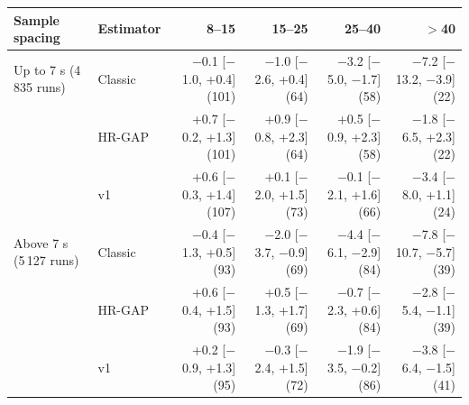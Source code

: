 \begin{tabular}{@{}llrrrr@{}}
\toprule
Sample spacing & Estimator & 8--15 & 15--25 & 25--40 & $>$40 \\
\midrule
Up to 7 s (4\,835 runs) & Classic & $-$0.1 [$-$1.0, +0.4] (101) & $-$1.0 [$-$2.6, +0.4] (64) & $-$3.2 [$-$5.0, $-$1.7] (58) & $-$7.2 [$-$13.2, $-$3.9] (22) \\
 & HR-GAP & +0.7 [$-$0.2, +1.3] (101) & +0.9 [$-$0.8, +2.3] (64) & +0.5 [$-$0.9, +2.3] (58) & $-$1.8 [$-$6.5, +2.3] (22) \\
 & \ascent{} v1 & +0.6 [$-$0.3, +1.4] (107) & +0.1 [$-$2.0, +1.5] (73) & $-$0.1 [$-$2.1, +1.6] (66) & $-$3.4 [$-$8.0, +1.1] (24) \\
\addlinespace[2pt]
Above 7 s (5\,127 runs) & Classic & $-$0.4 [$-$1.3, +0.5] (93) & $-$2.0 [$-$3.7, $-$0.9] (69) & $-$4.4 [$-$6.1, $-$2.9] (84) & $-$7.8 [$-$10.7, $-$5.7] (39) \\
 & HR-GAP & +0.6 [$-$0.4, +1.5] (93) & +0.5 [$-$1.3, +1.7] (69) & $-$0.7 [$-$2.3, +0.6] (84) & $-$2.8 [$-$5.4, $-$1.1] (39) \\
 & \ascent{} v1 & +0.2 [$-$0.9, +1.3] (95) & $-$0.3 [$-$2.4, +1.5] (72) & $-$1.9 [$-$3.5, $-$0.2] (86) & $-$3.8 [$-$6.4, $-$1.5] (41) \\
\bottomrule
\end{tabular}
